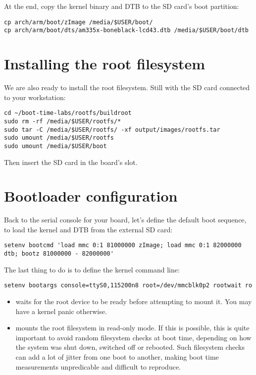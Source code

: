 At the end, copy the kernel binary and DTB to the SD card's boot
partition:

\begin{verbatim}
cp arch/arm/boot/zImage /media/$USER/boot/
cp arch/arm/boot/dts/am335x-boneblack-lcd43.dtb /media/$USER/boot/dtb
\end{verbatim}

\section{Installing the root filesystem}

We are also ready to install the root filesystem. Still with the SD card
connected to your workstation:

\begin{verbatim}
cd ~/boot-time-labs/rootfs/buildroot
sudo rm -rf /media/$USER/rootfs/*
sudo tar -C /media/$USER/rootfs/ -xf output/images/rootfs.tar
sudo umount /media/$USER/rootfs
sudo umount /media/$USER/boot
\end{verbatim}

Then insert the SD card in the board's slot.

\section{Bootloader configuration}

Back to the serial console for your board, let's define the default boot
sequence, to load the kernel and DTB from the external SD card:

{\footnotesize
\begin{verbatim}
setenv bootcmd 'load mmc 0:1 81000000 zImage; load mmc 0:1 82000000 dtb; bootz 81000000 - 82000000'
\end{verbatim}
}

{\footnotesize
The last thing to do is to define the kernel command line:
\begin{verbatim}
setenv bootargs console=ttyS0,115200n8 root=/dev/mmcblk0p2 rootwait ro
\end{verbatim}
}

\begin{itemize}
\item {} waits for the root device to be ready before
attempting to mount it. You may have a kernel panic otherwise.
\item {} mounts the root filesystem in read-only mode.
If this is possible, this is quite important to avoid random
filesystem checks at boot time, depending on how the system was shut
down, switched off or rebooted. Such filesystem checks can add a lot
of jitter from one boot to another, making boot time measurements
unpredicable and difficult to reproduce.
\end{itemize}

